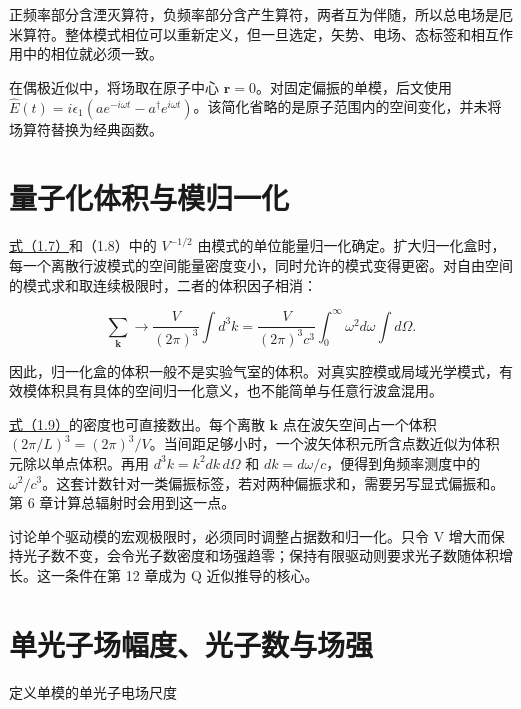 \documentclass[UTF8,a4paper,zihao=-4,openany,fontset=fandol]{ctexbook}
\begin{document}
正频率部分含湮灭算符，负频率部分含产生算符，两者互为伴随，所以总电场是厄米算符。整体模式相位可以重新定义，但一旦选定，矢势、电场、态标签和相互作用中的相位就必须一致。



在偶极近似中，将场取在原子中心 $\mathbf r=0$。对固定偏振的单模，后文使用 $\hat E(t)=i\epsilon_1(ae^{-i\omega t}-a^\dagger e^{i\omega t})$。该简化省略的是原子范围内的空间变化，并未将场算符替换为经典函数。



\section{量子化体积与模归一化}\label{sec:01:6}


\hyperref[eq:1.7]{式（1.7）}和（1.8）中的 $V^{-1/2}$ 由模式的单位能量归一化确定。扩大归一化盒时，每一个离散行波模式的空间能量密度变小，同时允许的模式变得更密。对自由空间的模式求和取连续极限时，二者的体积因子相消：



\begin{equation*}
\sum_{\mathbf k}\longrightarrow
\frac{V}{(2\pi)^3}\int d^3k
=\frac{V}{(2\pi)^3c^3}\int_0^\infty\omega^2d\omega\int d\Omega.
\tag{1.9}\label{eq:1.9}
\end{equation*}


因此，归一化盒的体积一般不是实验气室的体积。对真实腔模或局域光学模式，有效模体积具有具体的空间归一化意义，也不能简单与任意行波盒混用。



\hyperref[eq:1.9]{式（1.9）}的密度也可直接数出。每个离散 $\mathbf k$ 点在波矢空间占一个体积 $(2\pi/L)^3=(2\pi)^3/V$。当间距足够小时，一个波矢体积元所含点数近似为体积元除以单点体积。再用 $d^3k=k^2dk\,d\Omega$ 和 $dk=d\omega/c$，便得到角频率测度中的 $\omega^2/c^3$。这套计数针对一类偏振标签，若对两种偏振求和，需要另写显式偏振和。第 6 章计算总辐射时会用到这一点。



讨论单个驱动模的宏观极限时，必须同时调整占据数和归一化。只令 V 增大而保持光子数不变，会令光子数密度和场强趋零；保持有限驱动则要求光子数随体积增长。这一条件在第 12 章成为 Q 近似推导的核心。



\section{单光子场幅度、光子数与场强}\label{sec:01:7}


定义单模的单光子电场尺度
\end{document}
